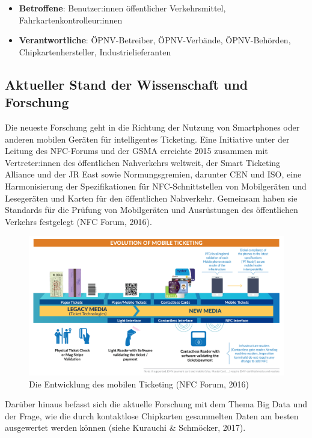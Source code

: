 \documentclass[
]{book}
\providecommand{\tightlist}{%
  \setlength{\itemsep}{0pt}\setlength{\parskip}{0pt}}
\begin{document}
\begin{itemize}
\tightlist
\item
  \textbf{Betroffene}: Benutzer:innen öffentlicher Verkehrsmittel, Fahrkartenkontrolleur:innen
\item
  \textbf{Verantwortliche}: ÖPNV-Betreiber, ÖPNV-Verbände, ÖPNV-Behörden, Chipkartenhersteller, Industrielieferanten
\end{itemize}

\hypertarget{aktueller-stand-der-wissenschaft-und-forschung-26}{%
\subsection*{Aktueller Stand der Wissenschaft und Forschung}\label{aktueller-stand-der-wissenschaft-und-forschung-26}}

Die neueste Forschung geht in die Richtung der Nutzung von Smartphones oder anderen mobilen Geräten für intelligentes Ticketing. Eine Initiative unter der Leitung des NFC-Forums und der GSMA erreichte 2015 zusammen mit Vertreter:innen des öffentlichen Nahverkehrs weltweit, der Smart Ticketing Alliance und der JR East sowie Normungsgremien, darunter CEN und ISO, eine Harmonisierung der Spezifikationen für NFC-Schnittstellen von Mobilgeräten und Lesegeräten und Karten für den öffentlichen Nahverkehr. Gemeinsam haben sie Standards für die Prüfung von Mobilgeräten und Ausrüstungen des öffentlichen Verkehrs festgelegt (NFC Forum, 2016).

\begin{figure}
\includegraphics[width=0.9\linewidth]{image/smart_cards} \caption{Die Entwicklung des mobilen Ticketing (NFC Forum, 2016)}\label{fig:unnamed-chunk-31}
\end{figure}

Darüber hinaus befasst sich die aktuelle Forschung mit dem Thema Big Data und der Frage, wie die durch kontaktlose Chipkarten gesammelten Daten am besten ausgewertet werden können (siehe Kurauchi \& Schmöcker, 2017).
\end{document}
